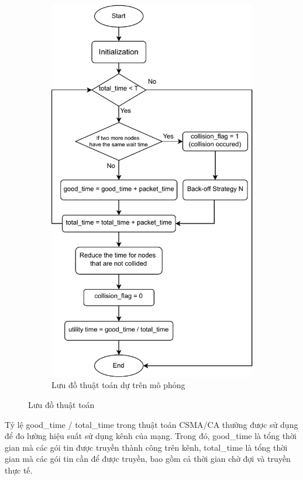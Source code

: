 \begin{figure}[h]
\begin{subfigure}[h]{0.45\linewidth}
        \centering
        \includegraphics[width=1.1\linewidth]{figures/Chapter2/code_flow.pdf}
        \caption{Lưu đồ thuật toán dự trên mô phỏng}
        \label{fig:flowcode}
    \end{subfigure}

    \caption{Lưu đồ thuật toán }
    \label{fig:csmacaflowchart}
\end{figure}

Tỷ lệ good\_time / total\_time trong thuật toán CSMA/CA thường được sử dụng để đo lường hiệu suất sử dụng kênh của mạng. Trong đó, good\_time là tổng thời gian mà các gói tin được truyền thành công trên kênh,
total\_time là tổng thời gian mà các gói tin cần để được truyền, bao gồm cả thời gian chờ đợi và truyền thực tế.
